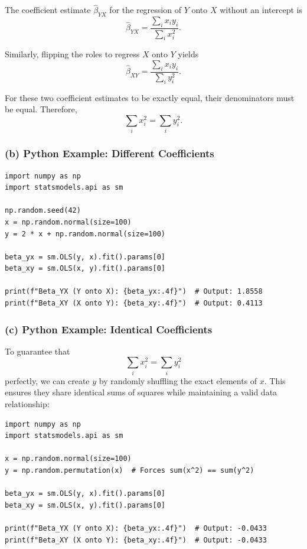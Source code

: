 \documentclass[12pt,a4paper]{article}
\begin{document}
The coefficient estimate $\hat{\beta}_{YX}$ for the regression of $Y$ onto $X$ without an intercept is
\[
\hat{\beta}_{YX}=
\frac{\sum_i x_i y_i}{\sum_i x_i^2}.
\]

Similarly, flipping the roles to regress $X$ onto $Y$ yields
\[
\hat{\beta}_{XY}=
\frac{\sum_i x_i y_i}{\sum_i y_i^2}.
\]

For these two coefficient estimates to be exactly equal, their denominators must be equal. Therefore,
\[
\boxed{\sum_i x_i^2=\sum_i y_i^2}.
\]

\subsubsection*{(b) Python Example: Different Coefficients}

\begin{lstlisting}
import numpy as np
import statsmodels.api as sm

np.random.seed(42)
x = np.random.normal(size=100)
y = 2 * x + np.random.normal(size=100)

beta_yx = sm.OLS(y, x).fit().params[0]
beta_xy = sm.OLS(x, y).fit().params[0]

print(f"Beta_YX (Y onto X): {beta_yx:.4f}")  # Output: 1.8558
print(f"Beta_XY (X onto Y): {beta_xy:.4f}")  # Output: 0.4113
\end{lstlisting}

\subsubsection*{(c) Python Example: Identical Coefficients}

To guarantee that
\[
\sum_i x_i^2=\sum_i y_i^2
\]
perfectly, we can create $y$ by randomly shuffling the exact elements of $x$. This ensures they share identical sums of squares while maintaining a valid data relationship:

\begin{lstlisting}
import numpy as np
import statsmodels.api as sm

x = np.random.normal(size=100)
y = np.random.permutation(x)  # Forces sum(x^2) == sum(y^2)

beta_yx = sm.OLS(y, x).fit().params[0]
beta_xy = sm.OLS(x, y).fit().params[0]

print(f"Beta_YX (Y onto X): {beta_yx:.4f}")  # Output: -0.0433
print(f"Beta_XY (X onto Y): {beta_xy:.4f}")  # Output: -0.0433
\end{lstlisting}
\end{document}
